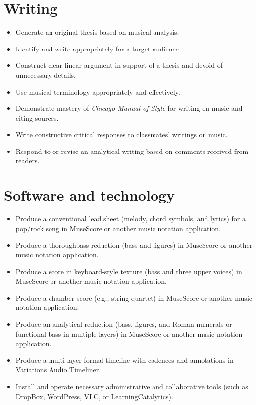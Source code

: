 \section{Writing}
\label{writing}

\begin{itemize}
\item Generate an original thesis based on musical analysis.

\item Identify and write appropriately for a target audience.

\item Construct clear linear argument in support of a thesis and devoid of unnecessary details.

\item Use musical terminology appropriately and effectively.

\item Demonstrate mastery of \emph{Chicago Manual of Style} for writing on music and citing sources.

\item Write constructive critical responses to classmates' writings on music.

\item Respond to or revise an analytical writing based on comments received from readers.

\end{itemize}

\section{Software and technology}
\label{softwareandtechnology}

\begin{itemize}
\item Produce a conventional lead sheet (melody, chord symbols, and lyrics) for a pop\slash rock song in MuseScore or another music notation application.

\item Produce a thoroughbass reduction (bass and figures) in MuseScore or another music notation application.

\item Produce a score in keyboard-style texture (bass and three upper voices) in MuseScore or another music notation application.

\item Produce a chamber score (e.g., string quartet) in MuseScore or another music notation application.

\item Produce an analytical reduction (bass, figures, and Roman numerals or functional bass in multiple layers) in MuseScore or another music notation application.

\item Produce a multi-layer formal timeline with cadences and annotations in Variations Audio Timeliner.

\item Install and operate necessary administrative and collaborative tools (such as DropBox, WordPress, VLC, or LearningCatalytics).

\end{itemize}

